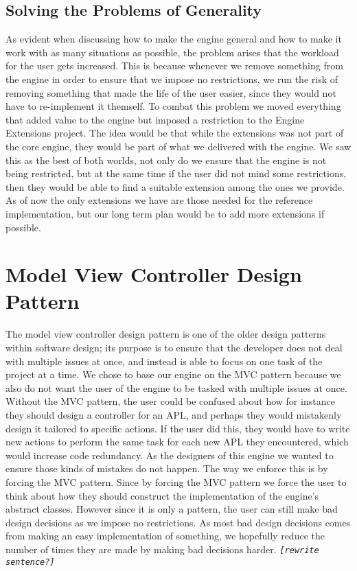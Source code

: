\subsection*{Solving the Problems of Generality}

As evident when discussing how to make the engine general and how
to make it work with as many situations as possible, the problem arises
that the workload for the user gets increased. This is because whenever
we remove something from the engine in order to ensure that we impose
no restrictions, we run the risk of removing something that made the
life of the user easier, since they would not have to re-implement
it themself. To combat this problem we moved everything that added
value to the engine but imposed a restriction to the Engine Extensions
project. The idea would be that while the extensions was not part
of the core engine, they would be part of what we delivered with the
engine. We saw this as the best of both worlds, not only do we ensure
that the engine is not being restricted, but at the same time if the
user did not mind some restrictions, then they would be able to find
a suitable extension among the ones we provide. As of now the only
extensions we have are those needed for the reference implementation,
but our long term plan would be to add more extensions if possible.


\section{Model View Controller Design Pattern}

The model view controller design pattern is one of the older design
patterns within software design; its purpose is to ensure that the
developer does not deal with multiple issues at once, and instead
is able to focus on one task of the project at a time. We chose to
base our engine on the MVC pattern because we also do not want the
user of the engine to be tasked with multiple issues at once. Without
the MVC pattern, the user could be confused about how for instance
they should design a controller for an APL, and perhaps they would
mistakenly design it tailored to specific actions. If the user did
this, they would have to write new actions to perform the same task
for each new APL they encountered, which would increase code redundancy.
As the designers of this engine we wanted to ensure those kinds of
mistakes do not happen. The way we enforce this is by forcing the
MVC pattern. Since by forcing the MVC pattern we force the user to
think about how they should construct the implementation of the engine\textquoteright{}s
abstract classes. However since it is only a pattern, the user can
still make bad design decisions as we impose no restrictions. As most
bad design decisions comes from making an easy implementation of something,
we hopefully reduce the number of times they are made by making bad
decisions harder. \texttt{\emph{{[}rewrite sentence?{]}}}


